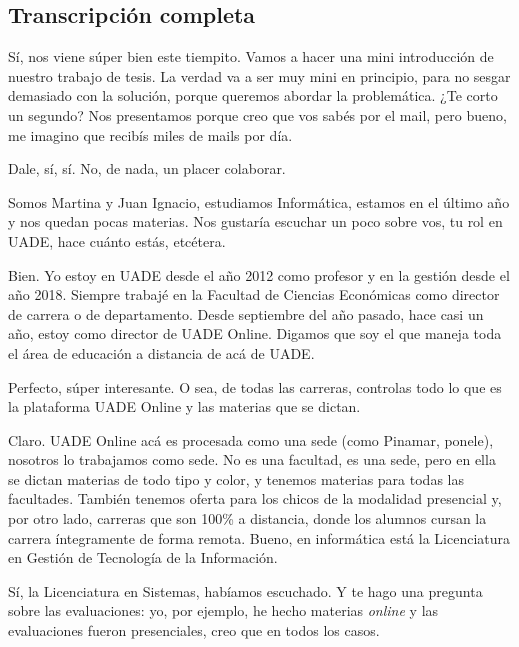 \subsection*{Transcripción completa}
\begin{description}[leftmargin=0cm, labelsep=0.5cm, style=nextline]
\item[\textbf{Entrevistador:}] Sí, nos viene súper bien este tiempito. Vamos a hacer una mini introducción de nuestro trabajo de tesis. La verdad va a ser muy mini en principio, para no sesgar demasiado con la solución, porque queremos abordar la problemática. ¿Te corto un segundo? Nos presentamos porque creo que vos sabés por el mail, pero bueno, me imagino que recibís miles de mails por día.
\item[\textbf{Entrevistado:}] Dale, sí, sí. No, de nada, un placer colaborar.
\item[\textbf{Entrevistador:}] Somos Martina y Juan Ignacio, estudiamos Informática, estamos en el último año y nos quedan pocas materias. Nos gustaría escuchar un poco sobre vos, tu rol en UADE, hace cuánto estás, etcétera.
\item[\textbf{Entrevistado:}] Bien. Yo estoy en UADE desde el año 2012 como profesor y en la gestión desde el año 2018. Siempre trabajé en la Facultad de Ciencias Económicas como director de carrera o de departamento. Desde septiembre del año pasado, hace casi un año, estoy como director de UADE Online. Digamos que soy el que maneja toda el área de educación a distancia de acá de UADE.
\item[\textbf{Entrevistador:}] Perfecto, súper interesante. O sea, de todas las carreras, controlas todo lo que es la plataforma UADE Online y las materias que se dictan.
\item[\textbf{Entrevistado:}] Claro. UADE Online acá es procesada como una sede (como Pinamar, ponele), nosotros lo trabajamos como sede. No es una facultad, es una sede, pero en ella se dictan materias de todo tipo y color, y tenemos materias para todas las facultades. También tenemos oferta para los chicos de la modalidad presencial y, por otro lado, carreras que son 100\% a distancia, donde los alumnos cursan la carrera íntegramente de forma remota. Bueno, en informática está la Licenciatura en Gestión de Tecnología de la Información.
\item[\textbf{Entrevistador:}] Sí, la Licenciatura en Sistemas, habíamos escuchado. Y te hago una pregunta sobre las evaluaciones: yo, por ejemplo, he hecho materias \textit{online} y las evaluaciones fueron presenciales, creo que en todos los casos.

\end{description}
